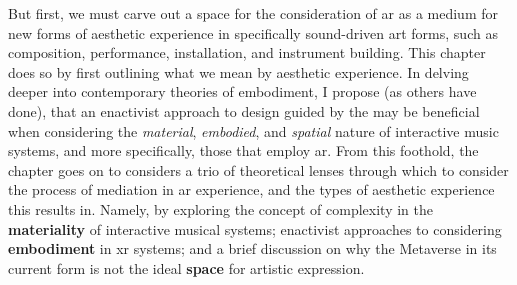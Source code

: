But first, we must carve out a space for the consideration of \gls{ar} as a medium for new forms of aesthetic experience in specifically sound-driven art forms, such as composition, performance, installation, and instrument building. This chapter does so by first outlining what we mean by aesthetic experience. In delving deeper into contemporary theories of embodiment, I propose (as others have done), that an enactivist approach to design guided by the  may be beneficial when considering the \textit{material}, \textit{embodied}, and \textit{spatial} nature of interactive music systems, and more specifically, those that employ \gls{ar}. From this foothold, the chapter goes on to considers a trio of theoretical lenses through which to consider the process of mediation in \gls{ar} experience, and the types of aesthetic experience this results in. Namely, by exploring the concept of complexity in the \textbf{materiality} of interactive musical systems; enactivist approaches to considering \textbf{embodiment} in \gls{xr} systems; and a brief discussion on why the Metaverse in its current form is not the ideal \textbf{space} for artistic expression.



